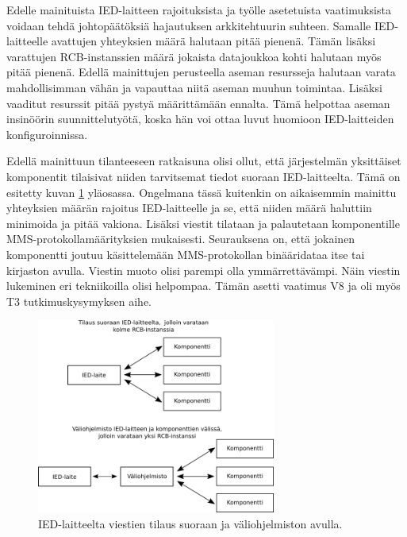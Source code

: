 Edelle mainituista IED-laitteen rajoituksista ja työlle asetetuista vaatimuksista voidaan tehdä johtopäätöksiä hajautuksen arkkitehtuurin suhteen. Samalle IED-laitteelle avattujen yhteyksien määrä halutaan pitää pienenä. Tämän lisäksi varattujen RCB-instanssien määrä jokaista datajoukkoa kohti halutaan myös pitää pienenä. Edellä mainittujen perusteella aseman resursseja halutaan varata mahdollisimman vähän ja vapauttaa niitä aseman muuhun toimintaa. Lisäksi vaaditut resurssit pitää pystyä määrittämään ennalta. Tämä helpottaa aseman insinöörin suunnittelutyötä, koska hän voi ottaa luvut huomioon IED-laitteiden konfiguroinnissa.

Edellä mainittuun tilanteeseen ratkaisuna olisi ollut, että järjestelmän yksittäiset komponentit tilaisivat niiden tarvitsemat tiedot suoraan IED-laitteelta. Tämä on esitetty kuvan \ref{fig:architecture-analysis} yläosassa. Ongelmana tässä kuitenkin on aikaisemmin mainittu yhteyksien määrän rajoitus IED-laitteelle ja se, että niiden määrä haluttiin minimoida ja pitää vakiona. Lisäksi viestit tilataan ja palautetaan komponentille MMS-protokollamäärityksien mukaisesti. Seurauksena on, että jokainen komponentti joutuu käsittelemään MMS-protokollan binääridataa itse tai kirjaston avulla. Viestin muoto olisi parempi olla ymmärrettävämpi. Näin viestin lukeminen eri tekniikoilla olisi helpompaa. Tämän asetti vaatimus V8 ja oli myös T3 tutkimuskysymyksen aihe.

\begin{figure}[ht!]
	\includegraphics[width=0.7\textwidth]{pictures/architecture-analysis.png}
	\caption{IED-laitteelta viestien tilaus suoraan ja väliohjelmiston avulla.}
	\label{fig:architecture-analysis}
\end{figure}

